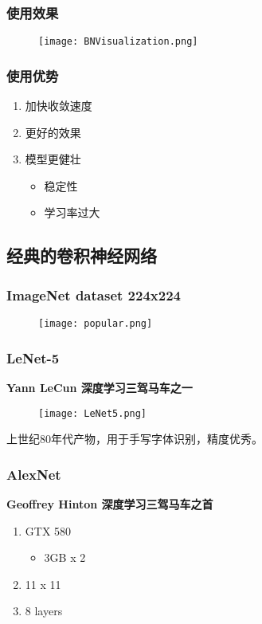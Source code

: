 \subsubsection{使用效果}
\begin{figure}[!h]
  \centering
  \texttt{[image: BNVisualization.png]}
\end{figure}

\subsubsection{使用优势}
\begin{enumerate}
  \item 加快收敛速度
  \item 更好的效果
  \item 模型更健壮
  \begin{itemize}
    \item 稳定性
    \item 学习率过大
  \end{itemize}
\end{enumerate}


\subsection{经典的卷积神经网络}
\subsubsection{ImageNet dataset 224x224}
\begin{figure}[!h]
  \centering
  \texttt{[image: popular.png]}
\end{figure}

\subsubsection{LeNet-5}
\textbf{Yann LeCun 深度学习三驾马车之一}
\begin{figure}[!h]
  \centering
  \texttt{[image: LeNet5.png]}
\end{figure}

上世纪80年代产物，用于手写字体识别，精度优秀。

\subsubsection{AlexNet}
\textbf{Geoffrey Hinton 深度学习三驾马车之首}

\begin{enumerate}
  \item GTX 580
    \begin{itemize}
      \item 3GB x 2
    \end{itemize}
  \item 11 x 11
  \item 8 layers
\end{enumerate}


